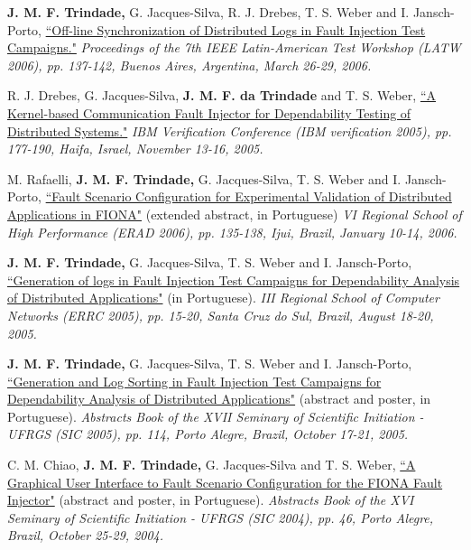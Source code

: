 \documentclass[line,margin]{res}
\begin{document}
\begin{resume}
\textbf{J. M. F. Trindade,} G. Jacques-Silva, R. J. Drebes, T. S. Weber and I. Jansch-Porto, \href{http://joanatrindade.wikidot.com/local--files/curriculum/latw2006.pdf}{``Off-line Synchronization of Distributed Logs in Fault Injection Test Campaigns."} \textit{Proceedings of the 7th IEEE Latin-American Test Workshop (LATW 2006), pp. 137-142, Buenos Aires, Argentina, March 26-29, 2006.}

R. J. Drebes, G. Jacques-Silva, \textbf{J. M. F. da Trindade} and T. S. Weber, \href{http://www.haifa.ibm.com/Workshops/PADTAD2005/papers/drebes.pdf}{``A Kernel-based Communication Fault Injector for Dependability Testing of Distributed Systems."} \textit{IBM Verification Conference (IBM verification 2005), pp. 177-190, Haifa, Israel, November 13-16, 2005.}

M. Rafaelli, \textbf{J. M. F. Trindade,} G. Jacques-Silva, T. S. Weber and I. Jansch-Porto, \href{http://joanatrindade.wikidot.com/local--files/curriculum/erad2006.pdf}{``Fault Scenario Configuration for Experimental Validation of Distributed Applications in FIONA"} (extended abstract, in Portuguese) \textit{VI Regional School of High Performance (ERAD 2006), pp. 135-138, Ijui, Brazil, January 10-14, 2006.}

\textbf{J. M. F. Trindade,} G. Jacques-Silva, T. S. Weber and I. Jansch-Porto, \href{http://joanatrindade.wikidot.com/local--files/curriculum/errc2005.pdf}{``Generation of logs in Fault Injection Test Campaigns for Dependability Analysis of Distributed Applications"} (in Portuguese). \textit{III Regional School of Computer Networks (ERRC 2005), pp. 15-20, Santa Cruz do Sul, Brazil, August 18-20, 2005.}

\textbf{J. M. F. Trindade,} G. Jacques-Silva, T. S. Weber and I. Jansch-Porto, \href{http://joanatrindade.wikidot.com/local--files/curriculum/sic2005.pdf#nameddest=328}{``Generation and Log Sorting in Fault Injection Test Campaigns for Dependability Analysis of Distributed Applications"} (abstract and poster, in Portuguese). \textit{Abstracts Book of the XVII Seminary of Scientific Initiation - UFRGS (SIC 2005), pp. 114, Porto Alegre, Brazil, October 17-21, 2005.}

C. M. Chiao, \textbf{J. M. F. Trindade,} G. Jacques-Silva and T. S. Weber, \href{http://joanatrindade.wikidot.com/local--files/curriculum/sic2004.pdf#nameddest=116}{``A Graphical User Interface to Fault Scenario Configuration for the FIONA Fault Injector"} (abstract and poster, in Portuguese). \textit{Abstracts Book of the XVI Seminary of Scientific Initiation - UFRGS (SIC 2004), pp. 46, Porto Alegre, Brazil, October 25-29, 2004.}
 

\end{resume}
\end{document}
